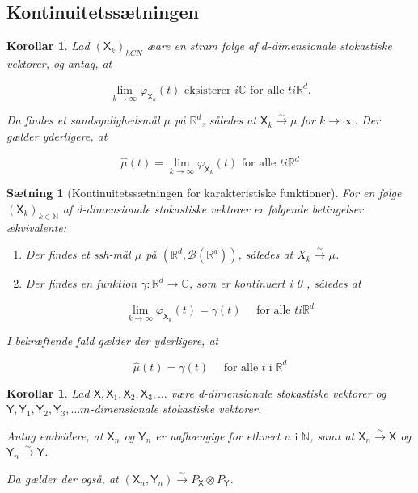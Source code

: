 \documentclass{article}
\newcommand{\1}{\mathbbm{1}}
\newcommand{\X}{\mathsf{X}}
\newcommand{\Y}{\mathsf{Y}}
\theoremstyle{boxed}
\newtheorem{corollary}[theorem]{Korollar}
\newtheorem{proposition}[theorem]{Sætning}
\begin{document}
\subsection{Kontinuitetssætningen}
\begin{theorem-box}
    \begin{corollary}
        Lad $\left(\mathsf{X}_k\right)_{h C N}$ æare en stram folge af $d$-dimensionale stokastiske vektorer, og antag, at

$$
\lim _{k \rightarrow \infty} \varphi_{\mathsf{X}_k}(t) \text { eksisterer } i \mathbb{C} \text { for alle } t i \mathbb{R}^d .
$$


Da findes et sandsynlighedsmål $\mu$ på $\mathbb{R}^d$, således at $\X_k \xrightarrow{\sim} \mu$ for $k \rightarrow \infty$.
Der gælder yderligere, at

$$
\hat{\mu} (t)=\lim _{k \rightarrow \infty} \varphi_{\X_k}(t) \text { for alle } t i \mathbb{R}^d
$$

    \end{corollary}
\end{theorem-box}
\begin{theorem-box}
    \begin{proposition}[Kontinuitetssætningen for karakteristiske funktioner]
        For en følge $\left(\X_k\right)_{k \in \mathbb{N}}$ af d-dimensionale stokastiske vektorer er følgende betingelser ækvivalente:
\begin{enumerate}
    \item[\textnormal{(i)}]  Der findes et ssh-mål $\mu$ på $\left(\mathbb{R}^d, \mathcal{B}\left(\mathbb{R}^d\right)\right)$, således at $X_k \xrightarrow{\sim} \mu$.
    \item[\textnormal{(ii)}] Der findes en funktion $\gamma: \mathbb{R}^d \rightarrow \mathbb{C}$, som er kontinuert i 0 , således at

    $$
    \lim _{k \rightarrow \infty} \varphi_{\X_k}(t)=\gamma(t) \quad \text { for alle } t i \mathbb{R}^d
    $$
    
\end{enumerate}
I bekræftende fald gælder der yderligere, at

$$
\hat{\mu}(t)=\gamma(t) \quad \text { for alle } t \;\text{i}\; \mathbb{R}^d
$$

    \end{proposition}
\end{theorem-box}
\begin{theorem-box}
    \begin{corollary}
        Lad $\X, \X_1, \X_2, \X_3, \ldots$ være d-dimensionale stokastiske vektorer og $\Y, \Y_1, \Y_2, \Y_3, \ldots m$-dimensionale stokastiske vektorer.

Antag endvidere, at $\X_n$ og $\Y_n$ er uafhængige for ethvert $n \text{ i } \mathbb{N}$, samt at $\X_n \xrightarrow{\sim} \X$ og $\Y_n \xrightarrow{\sim} \Y$.

Da gælder der også, at $\left(\X_n, \Y_n\right) \xrightarrow{\sim} P_{\X} \otimes P_{\Y}$.
    \end{corollary}
\end{theorem-box}
\end{document}
